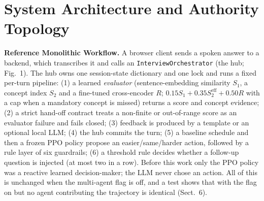 \documentclass[runningheads]{llncs}
\begin{document}
\section{System Architecture and Authority Topology}

\textbf{Reference Monolithic Workflow.} A browser client sends a spoken answer to a backend, which transcribes it and calls an \texttt{InterviewOrchestrator} (the hub; Fig.~1). The hub owns one session-state dictionary and one lock and runs a fixed per-turn pipeline: (1) a learned \emph{evaluator} (sentence-embedding similarity $S_1$, a concept index $S_2$ and a fine-tuned cross-encoder $R$; $0.15S_1 + 0.35S_2^{\mathrm{eff}} + 0.50R$ with a cap when a mandatory concept is missed) returns a score and concept evidence; (2) a strict hand-off contract treats a non-finite or out-of-range score as an evaluator failure and fails closed; (3) feedback is produced by a template or an optional local LLM; (4) the hub commits the turn; (5) a baseline schedule and then a frozen PPO policy \cite{raffin2021,schulman2017} propose an easier/same/harder action, followed by a rule layer of six guardrails; (6) a threshold rule decides whether a follow-up question is injected (at most two in a row). Before this work only the PPO policy was a reactive learned decision-maker; the LLM never chose an action. All of this is unchanged when the multi-agent flag is off, and a test shows that with the flag on but no agent contributing the trajectory is identical (Sect.~6).

\begin{table}[t]
\caption{Authority matrix, generated from the enforcing code (\texttt{agents/multiagent/authority.py}). Neither agent has state-write authority; the hub commits alone.}
\label{tab:authority}
\centering
{}
\end{table}
\end{document}

